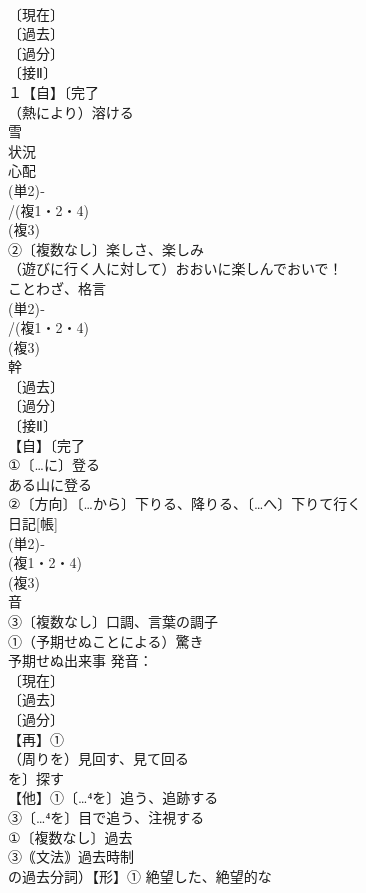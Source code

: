 \documentclass[8pt]{extreport}
\begin{document}
\begin{CJK}{UTF8}{min}
\\	〔現在〕
\\	〔過去〕
\\	〔過分〕
\\	〔接Ⅱ〕
\\	１【自】〔完了
\\	（熱により）溶ける 
\\	雪 
\\	状況
\\	心配 
\\	(単2)‐
\\	/(複1・2・4)
\\	(複3)
\\	②〔複数なし〕楽しさ、楽しみ 
\\	（遊びに行く人に対して）おおいに楽しんでおいで！
\\	ことわざ、格言 
\\	(単2)‐
\\	/(複1・2・4)
\\	(複3)
\\	幹 
\\	〔過去〕
\\	〔過分〕
\\	〔接Ⅱ〕
\\	【自】〔完了
\\	①〔…に〕登る 
\\	ある山に登る 
\\	②〔方向〕〔…から〕下りる、降りる、〔…へ〕下りて行く
\\	日記[帳] 
\\	(単2)‐
\\	(複1・2・4)
\\	(複3)
\\	音 
\\	③〔複数なし〕口調、言葉の調子
\\	①（予期せぬことによる）驚き 
\\	予期せぬ出来事 発音：
\\	〔現在〕
\\	〔過去〕
\\	〔過分〕
\\	【再】①
\\	（周りを）見回す、見て回る 
\\	を〕探す
\\	【他】①〔…⁴を〕追う、追跡する 
\\	③〔…⁴を〕目で追う、注視する
\\	①〔複数なし〕過去 
\\	③｟文法｠過去時制
\\	の過去分詞）【形】① 絶望した、絶望的な 

\end{CJK}
\end{document}
